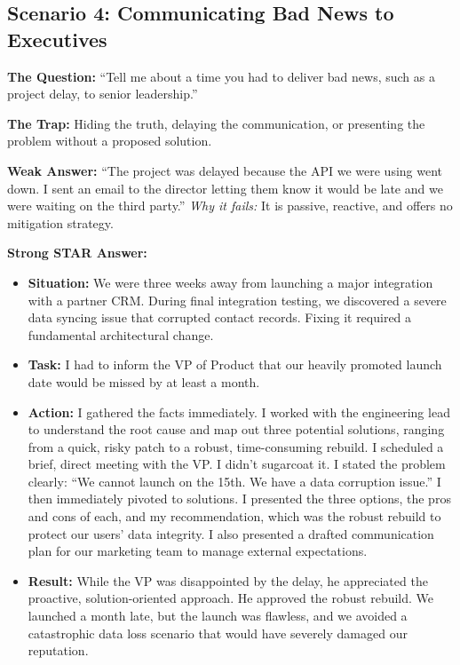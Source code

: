 \documentclass[
  11pt,
  openany,
  oneside]{book}
\providecommand{\tightlist}{%
  \setlength{\itemsep}{0pt}\setlength{\parskip}{0pt}}
\begin{document}
\subsection{Scenario 4: Communicating Bad News to
Executives}\label{scenario-4-communicating-bad-news-to-executives}

\textbf{The Question:} ``Tell me about a time you had to deliver bad
news, such as a project delay, to senior leadership.''

\textbf{The Trap:} Hiding the truth, delaying the communication, or
presenting the problem without a proposed solution.

\textbf{Weak Answer:} ``The project was delayed because the API we were
using went down. I sent an email to the director letting them know it
would be late and we were waiting on the third party.'' \emph{Why it
fails:} It is passive, reactive, and offers no mitigation strategy.

\textbf{Strong STAR Answer:}

\begin{itemize}
\tightlist
\item
  \textbf{Situation:} We were three weeks away from launching a major
  integration with a partner CRM. During final integration testing, we
  discovered a severe data syncing issue that corrupted contact records.
  Fixing it required a fundamental architectural change.
\item
  \textbf{Task:} I had to inform the VP of Product that our heavily
  promoted launch date would be missed by at least a month.
\item
  \textbf{Action:} I gathered the facts immediately. I worked with the
  engineering lead to understand the root cause and map out three
  potential solutions, ranging from a quick, risky patch to a robust,
  time-consuming rebuild. I scheduled a brief, direct meeting with the
  VP. I didn't sugarcoat it. I stated the problem clearly: ``We cannot
  launch on the 15th. We have a data corruption issue.'' I then
  immediately pivoted to solutions. I presented the three options, the
  pros and cons of each, and my recommendation, which was the robust
  rebuild to protect our users' data integrity. I also presented a
  drafted communication plan for our marketing team to manage external
  expectations.
\item
  \textbf{Result:} While the VP was disappointed by the delay, he
  appreciated the proactive, solution-oriented approach. He approved the
  robust rebuild. We launched a month late, but the launch was flawless,
  and we avoided a catastrophic data loss scenario that would have
  severely damaged our reputation.
\end{itemize}
\end{document}
